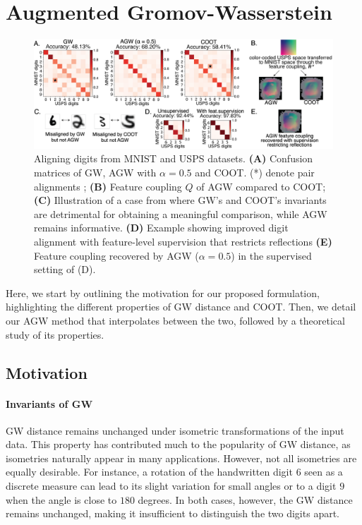 \section{Augmented Gromov-Wasserstein}

\begin{figure}[t]
\centering
\includegraphics[width=\linewidth]{./Chapitre5/fig//mnist1_supervised.png}
\caption{Aligning digits from MNIST and USPS datasets. \textbf{(A)}
Confusion matrices of GW, AGW with $\alpha=0.5$ and COOT.
(*) denote pair alignments ;
\textbf{(B)} Feature coupling $Q$ of AGW compared to COOT;
\textbf{(C)} Illustration of a case from where GW's and COOT's invariants are
detrimental for obtaining a meaningful comparison, while AGW remains informative.
\textbf{(D)} Example showing improved digit alignment with feature-level supervision
that restricts reflections \textbf{(E)} Feature coupling recovered by AGW ($\alpha =0.5$)
in the supervised setting of (D).}
\label{fig:mnist}
\end{figure}

Here, we start by outlining the motivation for our proposed formulation,
highlighting the different properties of GW distance and COOT. Then,
we detail our AGW method that interpolates between the two, followed by a
theoretical study of its properties.

\subsection{Motivation}

\paragraph{Invariants of GW} GW distance remains unchanged under isometric transformations of
the input data. This property has contributed much to the popularity of GW distance,
as isometries naturally appear in many applications. However,
not all isometries are equally desirable. For instance, a rotation of the
handwritten digit $6$ seen as a discrete measure can lead to its slight variation
for small angles or to a digit $9$ when the angle is close to $180$ degrees. In both cases,
however, the GW distance remains unchanged, making it insufficient to distinguish
the two digits apart.

